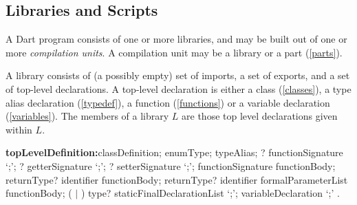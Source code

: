 \documentclass{article}
\newcommand{\code}[1]{{\sf #1}}
\begin{document}
\begin{itemize}






\section{Libraries and Scripts}

\LMHash{}
A Dart program consists of one or more libraries, and may be built out of one or more {\em compilation units}. A compilation unit may be a library or a part (\ref{parts}).

\LMHash{}
A library consists of (a possibly empty) set of imports, a set of exports,  and a set of top-level declarations. A top-level declaration is either a class (\ref{classes}), a type alias declaration (\ref{typedef}), a function (\ref{functions}) or a variable declaration (\ref{variables}). The members of a library $L$ are those top level declarations given within $L$.

 \begin{grammar}
{\bf topLevelDefinition:}classDefinition;
     enumType;
      typeAlias;
      \EXTERNAL{}? functionSignature `{\escapegrammar ;}';
      \EXTERNAL{}? getterSignature `{\escapegrammar ;}';
      \EXTERNAL{}? setterSignature `{\escapegrammar ;}';
      functionSignature functionBody;
      returnType? \GET{} identifier functionBody;
      returnType? \SET{} identifier formalParameterList functionBody;
      (\FINAL{} $|$ \CONST{}) type? staticFinalDeclarationList `{\escapegrammar ;}';
      variableDeclaration `{\escapegrammar ;}'
    .


\end{grammar}
\end{itemize}
\end{document}
